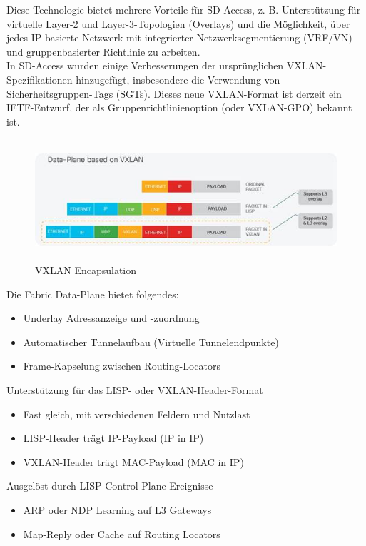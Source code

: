 Diese Technologie bietet mehrere Vorteile für SD-Access, z. B. Unterstützung für virtuelle Layer-2 und Layer-3-Topologien (Overlays) und die Möglichkeit, über jedes IP-basierte Netzwerk mit integrierter Netzwerksegmentierung (VRF/VN) und gruppenbasierter Richtlinie zu arbeiten. \\ 

In SD-Access wurden einige Verbesserungen der ursprünglichen VXLAN-Spezifikationen hinzugefügt, insbesondere die Verwendung von Sicherheitsgruppen-Tags (SGTs). Dieses neue VXLAN-Format ist derzeit ein IETF-Entwurf, der als Gruppenrichtlinienoption (oder VXLAN-GPO) bekannt ist.

\begin{figure}[H]
	\centering
	\includegraphics[height=4.5cm]{img/vxlan-encapsulation.jpg}
	\caption{VXLAN Encapsulation}
	\label{fig:VXLAN Encapsulation}
\end{figure}

Die Fabric Data-Plane bietet folgendes:
\begin{itemize}
	\item Underlay Adressanzeige und -zuordnung
	\item Automatischer Tunnelaufbau (Virtuelle Tunnelendpunkte)
	\item Frame-Kapselung zwischen Routing-Locators
\end{itemize}

Unterstützung für das LISP- oder VXLAN-Header-Format
\begin{itemize}
	\item Fast gleich, mit verschiedenen Feldern und Nutzlast
	\item LISP-Header trägt IP-Payload (IP in IP)
	\item VXLAN-Header trägt MAC-Payload (MAC in IP)
\end{itemize}

Ausgelöst durch LISP-Control-Plane-Ereignisse
\begin{itemize}
	\item ARP oder NDP Learning auf L3 Gateways
	\item Map-Reply oder Cache auf Routing Locators
\end{itemize}

